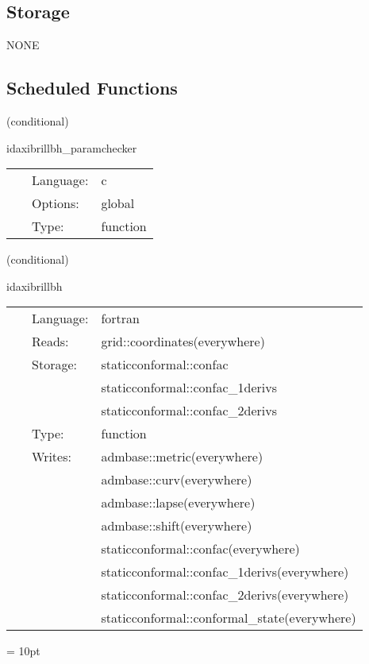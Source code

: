 \documentclass{article}
\begin{document}
\subsection*{Storage}NONE
\subsection*{Scheduled Functions}
\vspace{5mm}

   (conditional) 

\hspace{5mm} idaxibrillbh\_paramchecker 

\hspace{5mm}{\it check that the metric\_type is recognised } 


\hspace{5mm}

 \begin{tabular*}{160mm}{cll} 
~ & Language:  & c \\ 
~ & Options:  & global \\ 
~ & Type:  & function \\ 
\end{tabular*} 


\vspace{5mm}

   (conditional) 

\hspace{5mm} idaxibrillbh 

\hspace{5mm}{\it construct idaxibrillbh } 


\hspace{5mm}

 \begin{tabular*}{160mm}{cll} 
~ & Language:  & fortran \\ 
~ & Reads:  & grid::coordinates(everywhere) \\ 
~ & Storage:  & staticconformal::confac \\ 
~& ~ &staticconformal::confac\_1derivs\\ 
~& ~ &staticconformal::confac\_2derivs\\ 
~ & Type:  & function \\ 
~ & Writes:  & admbase::metric(everywhere) \\ 
~& ~ &admbase::curv(everywhere)\\ 
~& ~ &admbase::lapse(everywhere)\\ 
~& ~ &admbase::shift(everywhere)\\ 
~& ~ &staticconformal::confac(everywhere)\\ 
~& ~ &staticconformal::confac\_1derivs(everywhere)\\ 
~& ~ &staticconformal::confac\_2derivs(everywhere)\\ 
~& ~ &staticconformal::conformal\_state(everywhere)\\ 
\end{tabular*} 



\vspace{5mm}\parskip = 10pt 
\end{document}
